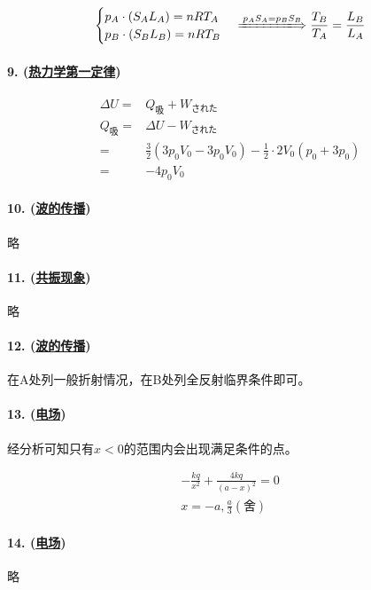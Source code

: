 \begin{equation*}
    \begin{cases}
        p_A\cdot(S_AL_A)=nRT_A\\
        p_B\cdot(S_BL_B)=nRT_B
    \end{cases}\xLongrightarrow{p_AS_A=p_BS_B}
    \frac{T_B}{T_A}=\frac{L_B}{L_A}
\end{equation*}

\paragraph{9. (\hyperref[subsec:热力学第一定律]{热力学第一定律})}

\begin{align*}
    \Delta U=&Q_\textrm{吸}+W_\textrm{された}\\
    Q_\textrm{吸}=&\Delta U-W_\textrm{された}\\
    =&\frac32(3p_0V_0-3p_0V_0)-\frac12\cdot2V_0(p_0+3p_0)\\
    =&-4p_0V_0
\end{align*}

\paragraph{10. (\hyperref[subsec:波的传播]{波的传播})} 略
\paragraph{11. (\hyperref[subsec:共振现象]{共振现象})} 略
\paragraph{12. (\hyperref[subsec:波的传播]{波的传播})} 在A处列一般折射情况，在B处列全反射临界条件即可。
\paragraph{13. (\hyperref[subsec:电场]{电场})} 经分析可知只有$x<0$的范围内会出现满足条件的点。

\begin{gather*}
    -\frac{kq}{x^2}+\frac{4kq}{(a-x)^2}=0\\
    x=-a,\frac{a}{3}(\textrm{舍})
\end{gather*}

\paragraph{14. (\hyperref[subsec:电场]{电场})} 略
